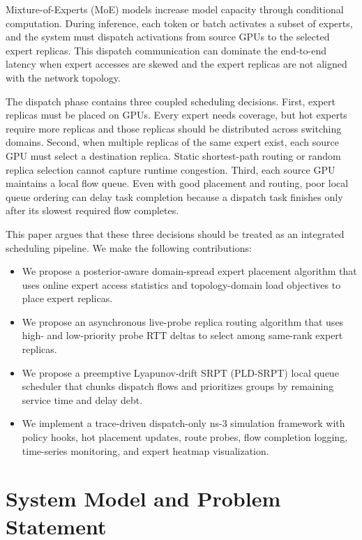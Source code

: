 \documentclass[10pt,conference]{IEEEtran}
\begin{document}
Mixture-of-Experts (MoE) models increase model capacity through conditional computation. During inference, each token or batch activates a subset of experts, and the system must dispatch activations from source GPUs to the selected expert replicas. This dispatch communication can dominate the end-to-end latency when expert accesses are skewed and the expert replicas are not aligned with the network topology.

The dispatch phase contains three coupled scheduling decisions. First, expert replicas must be placed on GPUs. Every expert needs coverage, but hot experts require more replicas and those replicas should be distributed across switching domains. Second, when multiple replicas of the same expert exist, each source GPU must select a destination replica. Static shortest-path routing or random replica selection cannot capture runtime congestion. Third, each source GPU maintains a local flow queue. Even with good placement and routing, poor local queue ordering can delay task completion because a dispatch task finishes only after its slowest required flow completes.

This paper argues that these three decisions should be treated as an integrated scheduling pipeline. We make the following contributions:

\begin{itemize}
  \item We propose a posterior-aware domain-spread expert placement algorithm that uses online expert access statistics and topology-domain load objectives to place expert replicas.
  \item We propose an asynchronous live-probe replica routing algorithm that uses high- and low-priority probe RTT deltas to select among same-rank expert replicas.
  \item We propose a preemptive Lyapunov-drift SRPT (PLD-SRPT) local queue scheduler that chunks dispatch flows and prioritizes groups by remaining service time and delay debt.
  \item We implement a trace-driven dispatch-only ns-3 simulation framework with policy hooks, hot placement updates, route probes, flow completion logging, time-series monitoring, and expert heatmap visualization.
\end{itemize}

\section{System Model and Problem Statement}
\end{document}
